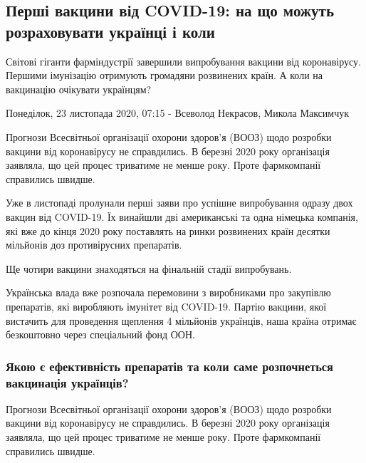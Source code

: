  
 
 

\subsection{Перші вакцини від COVID-19: на що можуть розраховувати українці і коли}
\label{sec:23_11_2020.news.ua.pravda.1.vaccine}


Світові гіганти фарміндустрії завершили випробування вакцини від коронавірусу.
Першими імунізацію отримують громадяни розвинених країн. А коли на вакцинацію
очікувати українцям?

Понеділок, 23 листопада 2020, 07:15 - Всеволод Некрасов, Микола Максимчук

Прогнози Всесвітньої організації охорони здоров'я (ВООЗ) щодо розробки вакцини
від коронавірусу не справдились. В березні 2020 року організація заявляла, що
цей процес триватиме не менше року. Проте фармкомпанії справились швидше.

Уже в листопаді пролунали перші заяви про успішне випробування одразу двох
вакцин від COVID-19. Їх винайшли дві американські та одна німецька компанія,
які вже до кінця 2020 року поставлять на ринки розвинених країн десятки
мільйонів доз противірусних препаратів.

Ще чотири вакцини знаходяться на фінальній стадії випробувань.

Українська влада вже розпочала перемовини з виробниками про закупівлю
препаратів, які виробляють імунітет від COVID-19. Партію вакцини, якої
вистачить для проведення щеплення 4 мільйонів українців, наша країна отримає
безкоштовно через спеціальний фонд ООН.

\subsubsection{Якою є ефективність препаратів та коли саме розпочнеться вакцинація українців?}

Прогнози Всесвітньої організації охорони здоров'я (ВООЗ) щодо розробки вакцини
від коронавірусу не справдились. В березні 2020 року організація заявляла, що
цей процес триватиме не менше року. Проте фармкомпанії справились швидше.

